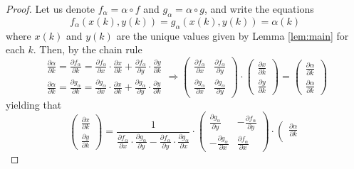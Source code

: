 \documentclass[10pt,a4paper]{amsart}
\begin{document}
\begin{proof}
Let us denote $f_{\alpha}=\alpha\circ f$ and $g_{\alpha}=\alpha\circ g$,
and write the equations
\[
f_{\alpha}(x(k),y(k))=g_{\alpha}(x(k),y(k))=\alpha(k)
\]
where $x(k)$ and $y(k)$ are the unique values given by Lemma \ref{lem:main}
for each $k$. Then, by the chain rule
\[
\begin{array}{c}
\frac{\partial\alpha}{\partial k}=\frac{\partial f_{\alpha}}{\partial k}=\frac{\partial f_{\alpha}}{\partial x}\cdot\frac{\partial x}{\partial k}+\frac{\partial f_{\alpha}}{\partial y}\cdot\frac{\partial y}{\partial k}\\
\frac{\partial\alpha}{\partial k}=\frac{\partial g_{\alpha}}{\partial k}=\frac{\partial g_{\alpha}}{\partial x}\cdot\frac{\partial x}{\partial k}+\frac{\partial g_{\alpha}}{\partial y}\cdot\frac{\partial y}{\partial k}
\end{array}\Rightarrow\left(\begin{array}{cc}
\frac{\partial f_{\alpha}}{\partial x} & \frac{\partial f_{\alpha}}{\partial y}\\
\frac{\partial g_{\alpha}}{\partial x} & \frac{\partial g_{\alpha}}{\partial y}
\end{array}\right)\cdot\left(\begin{array}{c}
\frac{\partial x}{\partial k}\\
\frac{\partial y}{\partial k}
\end{array}\right)=\left(\begin{array}{c}
\frac{\partial\alpha}{\partial k}\\
\frac{\partial\alpha}{\partial k}
\end{array}\right)
\]
yielding that
\[
\left(\begin{array}{c}
\frac{\partial x}{\partial k}\\
\frac{\partial y}{\partial k}
\end{array}\right)=\frac{1}{\frac{\partial f_{\alpha}}{\partial x}\cdot\frac{\partial g_{\alpha}}{\partial y}-\frac{\partial f_{\alpha}}{\partial y}\cdot\frac{\partial g_{\alpha}}{\partial x}}\cdot\left(\begin{array}{cc}
\frac{\partial g_{\alpha}}{\partial y} & -\frac{\partial f_{\alpha}}{\partial y}\\
-\frac{\partial g_{\alpha}}{\partial x} & \frac{\partial f_{\alpha}}{\partial x}
\end{array}\right)\cdot\left(\begin{array}{c}
\frac{\partial\alpha}{\partial k}\\

\end{array}\]
\end{proof}
\end{document}
